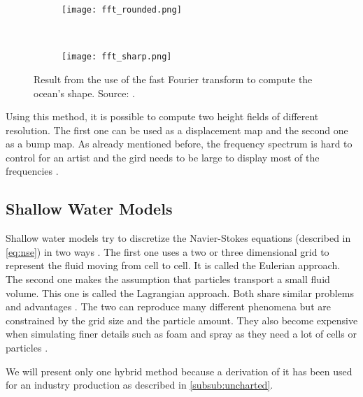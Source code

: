 \begin{figure}[hbt!]
    \centering
    \begin{subfigure}[hbt]{0.45\textwidth}
        \centering
        \texttt{[image: fft\_rounded.png]}
        \label{subfig:fft_round}
    \end{subfigure}~%
    \begin{subfigure}[hbt]{0.45\textwidth}
        \centering
        \texttt{[image: fft\_sharp.png]}
        \label{subfig:fft_sharp}
    \end{subfigure}
    \caption{Result from the use of the fast Fourier transform to compute the
    ocean's shape. Source:
    \autocite{tessendorf2001simulating}.}\label{fig:fft_comparison}
\end{figure}

Using this method, it is possible to compute two height fields of different
resolution. The first one can be used as a displacement map and the second one
as a bump map. As already mentioned before, the frequency spectrum is hard to
control for an artist and the gird needs to be large to display most of the
frequencies \autocite{gonzalez2016rendering}.



\subsection{Shallow Water Models}\label{subsec:shallow_water}

Shallow water models try to discretize the Navier-Stokes equations (described in
\autoref{eq:nse}) in two ways \autocite{darles2011survey}. The first one uses a
two or three dimensional grid to represent the fluid moving from cell to cell.
It is called the Eulerian approach. The second one makes the assumption that
particles transport a small fluid volume. This one is called the Lagrangian
approach. Both share similar problems and advantages
\autocite{darles2011survey}. The two can reproduce many different phenomena but
are constrained by the grid size and the particle amount. They also become
expensive when simulating finer details such as foam and spray as they need a
lot of cells or particles \autocite{darles2011survey}.

We will present only one hybrid method because a derivation of it has been used
for an industry production as described in \cref{subsub:uncharted}.

